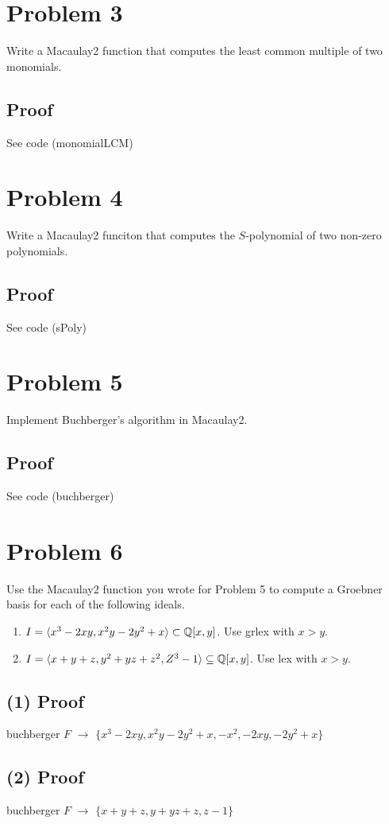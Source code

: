 \documentclass{article}
\begin{document}
\section*{Problem 3}

Write a Macaulay2 function that computes the least common multiple of two monomials.

\subsection*{Proof}

See code (monomialLCM)

\section*{Problem 4}

Write a Macaulay2 funciton that computes the $S$-polynomial of two non-zero polynomials.

\subsection*{Proof}

See code (sPoly)

\section*{Problem 5}

Implement Buchberger's algorithm in Macaulay2.

\subsection*{Proof}

See code (buchberger)

\section*{Problem 6}

Use the Macaulay2 function you wrote for Problem 5 to compute a Groebner basis for each of the following ideals.

\begin{enumerate}[label = (\arabic*)]
\item $I = \langle x^3 - 2xy, x^2y - 2y^2 + x \rangle \subset \mathbb Q[x,y]$. Use grlex with $x >y$.
\item $I = \langle x + y + z, y^2 + yz + z^2, Z^3 - 1 \rangle \subseteq \mathbb Q[x,y]$. Use lex with $x > y$.
\end{enumerate}

\subsection*{(1) Proof}

buchberger $F$ $\rightarrow$ $\{x^3 - 2xy, x^2y - 2y^2 + x, -x^2,-2xy,-2y^2 +x \}$

\subsection*{(2) Proof}

buchberger $F$ $\rightarrow$ $\{x + y + z, y  + yz + z , z  - 1\}$
\end{document}
